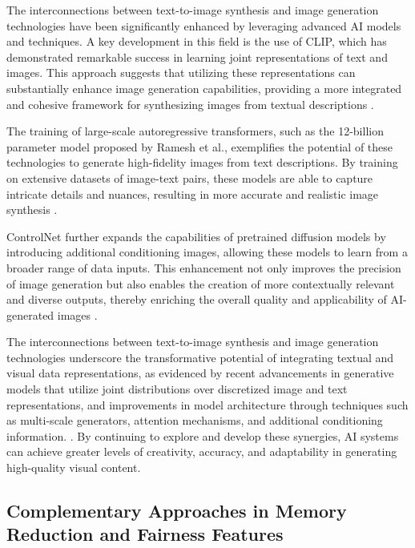The interconnections between text-to-image synthesis and image generation technologies have been significantly enhanced by leveraging advanced AI models and techniques. A key development in this field is the use of CLIP, which has demonstrated remarkable success in learning joint representations of text and images. This approach suggests that utilizing these representations can substantially enhance image generation capabilities, providing a more integrated and cohesive framework for synthesizing images from textual descriptions \cite{Hierarchic4}.



The training of large-scale autoregressive transformers, such as the 12-billion parameter model proposed by Ramesh et al., exemplifies the potential of these technologies to generate high-fidelity images from text descriptions. By training on extensive datasets of image-text pairs, these models are able to capture intricate details and nuances, resulting in more accurate and realistic image synthesis \cite{ramesh2021zero}.



ControlNet further expands the capabilities of pretrained diffusion models by introducing additional conditioning images, allowing these models to learn from a broader range of data inputs. This enhancement not only improves the precision of image generation but also enables the creation of more contextually relevant and diverse outputs, thereby enriching the overall quality and applicability of AI-generated images \cite{zhang2023adding}.



The interconnections between text-to-image synthesis and image generation technologies underscore the transformative potential of integrating textual and visual data representations, as evidenced by recent advancements in generative models that utilize joint distributions over discretized image and text representations, and improvements in model architecture through techniques such as multi-scale generators, attention mechanisms, and additional conditioning information. \cite{rombach2022high,ramesh2021zero}. By continuing to explore and develop these synergies, AI systems can achieve greater levels of creativity, accuracy, and adaptability in generating high-quality visual content.



\subsection{Complementary Approaches in Memory Reduction and Fairness Features} \label{subsec:Complementary Approaches in Memory Reduction and Fairness Features}

